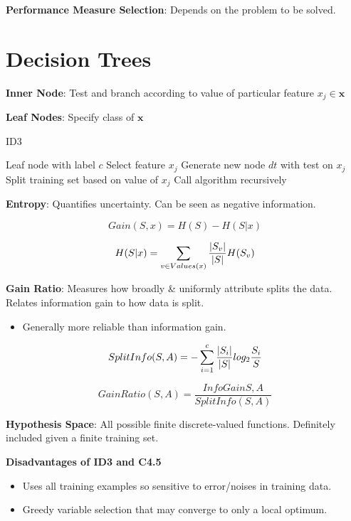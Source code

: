 \documentclass[10pt]{article}
\DeclarePairedDelimiter{\abs}{\lvert}{\rvert}
\begin{document}
\begin{multicols}{3}
  \noindent
  \textbf{Performance Measure Selection}: Depends on the problem to be solved.

  \section{Decision Trees}

  \textbf{Inner Node}: Test and branch according to value of particular feature ${x_j \in \mathbf{x}}$

  \noindent
  \textbf{Leaf Nodes}: Specify class of $\mathbf{x}$

  \begin{algorithm}[h]
    \caption{ID3}\label{alg:ID3}
    \begin{algorithmic}[1]
        \Return Leaf node with label $c$
      \EndIf
      \State Select feature $x_j$
      \State Generate new node $dt$ with test on $x_j$
      \State Split training set based on value of $x_j$
      \State Call algorithm recursively
    \end{algorithmic}
  \end{algorithm}

  \noindent
  \textbf{Entropy}: Quantifies uncertainty.  Can be seen as negative information.

  \[ Gain(S,x) = H(S) - H(S\vert x) \]

  \[ H(S\vert x) = \sum_{v\in Values(x)} \frac{\abs{S_v}}{\abs{S}} H(S_v) \]

  \noindent
  \textbf{Gain Ratio}: Measures how broadly \& uniformly attribute splits the data.  Relates information gain to how data is split.
  \begin{itemize}
    \item Generally more reliable than information gain.
  \end{itemize}

  \[SplitInfo(S,A) = -\sum_{i=1}^{c} \frac{\abs{S_i}}{\abs{S}} log_{2} \frac{S_i}{S} \]

  \[ GainRatio(S,A) = \frac{InfoGain{S,A}}{SplitInfo(S,A)} \]

  \textbf{Hypothesis Space}: All possible finite discrete-valued functions.  Definitely included given a finite training set.

  \textbf{Disadvantages of ID3 and C4.5}
  \begin{itemize}
    \item Uses all training examples so sensitive to error/noises in training data.
    \item Greedy variable selection that may converge to only a local optimum.
  \end{itemize}


\end{multicols}
\end{document}
